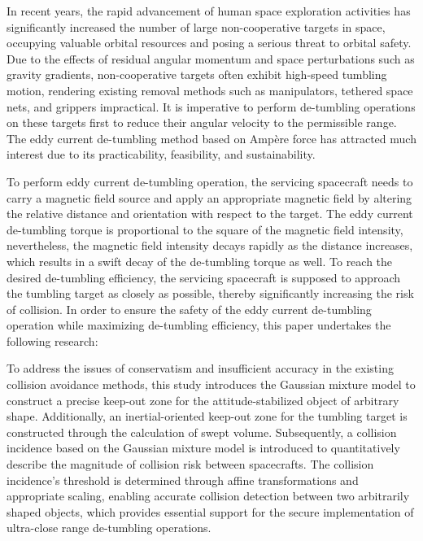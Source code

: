 \documentclass[lang=chs, degree=master, blindreview=false, winfonts=true]{yanputhesis}
\begin{document}
\begin{engabstract}                                         %
    In recent years, the rapid advancement of human space exploration activities has significantly increased the number of large non-cooperative targets in space, occupying valuable orbital resources and posing a serious threat to orbital safety. Due to the effects of residual angular momentum and space perturbations such as gravity gradients, non-cooperative targets often exhibit high-speed tumbling motion, rendering existing removal methods such as manipulators, tethered space nets, and grippers impractical. It is imperative to perform de-tumbling operations on these targets first to reduce their angular velocity to the permissible range. The eddy current de-tumbling method based on Ampère force has attracted much interest due to its practicability, feasibility, and sustainability. 
    
    To perform eddy current de-tumbling operation, the servicing spacecraft needs to carry a magnetic field source and apply an appropriate magnetic field by altering the relative distance and orientation with respect to the target. The eddy current de-tumbling torque is proportional to the square of the magnetic field intensity, nevertheless, the magnetic field intensity decays rapidly as the distance increases, which results in a swift decay of the de-tumbling torque as well. To reach the desired de-tumbling efficiency, the servicing spacecraft is supposed to approach the tumbling target as closely as possible, thereby significantly increasing the risk of collision. In order to ensure the safety of the eddy current de-tumbling operation while maximizing de-tumbling efficiency, this paper undertakes the following research:
    
    To address the issues of conservatism and insufficient accuracy in the existing collision avoidance methods, this study introduces the Gaussian mixture model to construct a precise keep-out zone for the attitude-stabilized object of arbitrary shape. Additionally, an inertial-oriented keep-out zone for the tumbling target is constructed through the calculation of swept volume. Subsequently, a collision incidence based on the Gaussian mixture model is introduced to quantitatively describe the magnitude of collision risk between spacecrafts. The collision incidence's threshold is determined through affine transformations and appropriate scaling, enabling accurate collision detection between two arbitrarily shaped objects, which provides essential support for the secure implementation of ultra-close range de-tumbling operations.
    

\end{engabstract}
\end{document}

